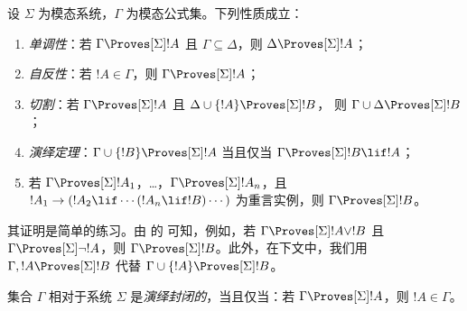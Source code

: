 \documentclass[../../../include/open-logic-section]{subfiles}
\begin{document}


\begin{prop}
  设 $\Sigma$ 为模态系统，$\Gamma$ 为模态公式集。下列性质成立：
  \begin{enumerate}
  \item{} \emph{单调性}：若
    $\Gamma \Proves[\Sigma] !A$ 且 $\Gamma \subseteq \Delta$，则
    $\Delta \Proves[\Sigma] !A$；
  \item{}
    \emph{自反性}：若 $!A \in \Gamma$，则 $\Gamma
    \Proves[\Sigma] !A$；
  \item{} \emph{切割}：若 $\Gamma
    \Proves[\Sigma] !A$ 且 $\Delta \cup \{!A\} \Proves[\Sigma] !B$，
    则 $\Gamma \cup \Delta \Proves[\Sigma] !B$；
  \item{} \emph{演绎定理}：$\Gamma \cup \{!B\}
    \Proves[\Sigma] !A$ 当且仅当 $\Gamma \Proves[\Sigma] !B \lif
      !A$；
  \item {}%
    若 $\Gamma \Proves[\Sigma] !A_1$，\dots，$\Gamma
    \Proves[\Sigma] !A_n$，且 $!A_1 \to (!A_2 \lif \cdots (!A_n \lif
    !B)\cdots)$ 为重言实例，则 $\Gamma
    \Proves[\Sigma] !B$。
  \end{enumerate}
\end{prop}

其证明是简单的练习。由  的
 可知，例如，若 $\Gamma \Proves[\Sigma] !A \lor !B$
且 $\Gamma \Proves[\Sigma] \lnot !A$，则 $\Gamma \Proves[\Sigma]
!B$。此外，在下文中，我们用 $\Gamma, !A \Proves[\Sigma] !B$
代替 $\Gamma \cup \{ !A\} \Proves[\Sigma] !B$。

\begin{defn}
  集合 $\Gamma$ 相对于系统 $\Sigma$ 是\emph{演绎封闭的}，当且仅当：若 $\Gamma \Proves[\Sigma] !A$，则
  $!A \in \Gamma$。
\end{defn}
\end{document}
